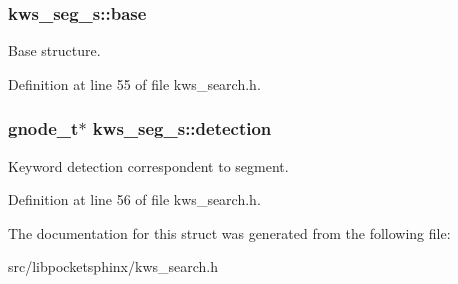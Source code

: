 \subsubsection[{base}]{ kws\+\_\+seg\+\_\+s\+::base}\label{structkws__seg__s_ab8b059f475f5e64301195cf9816bde2a}


Base structure. 



Definition at line 55 of file kws\+\_\+search.\+h.

\subsubsection[{detection}]{\setlength{\rightskip}{0pt plus 5cm}gnode\+\_\+t$\ast$ kws\+\_\+seg\+\_\+s\+::detection}\label{structkws__seg__s_a5de99d98b2be6e0348033c9fc05ec139}


Keyword detection correspondent to segment. 



Definition at line 56 of file kws\+\_\+search.\+h.



The documentation for this struct was generated from the following file\+:\begin{DoxyCompactItemize}
\item 
src/libpocketsphinx/kws\+\_\+search.\+h\end{DoxyCompactItemize}
